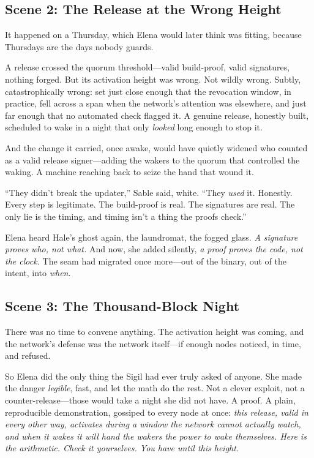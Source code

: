 \hypertarget{scene-2-the-release-at-the-wrong-height}{%
\subsection{Scene 2: The Release at the Wrong
Height}\label{scene-2-the-release-at-the-wrong-height}}

It happened on a Thursday, which Elena would later think was fitting, because
Thursdays are the days nobody guards.

A release crossed the quorum threshold---valid build-proof, valid signatures,
nothing forged. But its activation height was wrong. Not wildly wrong. Subtly,
catastrophically wrong: set just close enough that the revocation window, in
practice, fell across a span when the network's attention was elsewhere, and just
far enough that no automated check flagged it. A genuine release, honestly built,
scheduled to wake in a night that only \emph{looked} long enough to stop it.

And the change it carried, once awake, would have quietly widened who counted as a
valid release signer---adding the wakers to the quorum that controlled the waking.
A machine reaching back to seize the hand that wound it.

``They didn't break the updater,'' Sable said, white. ``They \emph{used} it.
Honestly. Every step is legitimate. The build-proof is real. The signatures are
real. The only lie is the timing, and timing isn't a thing the proofs check.''

Elena heard Hale's ghost again, the laundromat, the fogged glass. \emph{A
signature proves who, not what.} And now, she added silently, \emph{a proof proves
the code, not the clock.} The seam had migrated once more---out of the binary, out
of the intent, into \emph{when}.

\hypertarget{scene-3-the-thousand-block-night}{%
\subsection{Scene 3: The Thousand-Block
Night}\label{scene-3-the-thousand-block-night}}

There was no time to convene anything. The activation height was coming, and the
network's defense was the network itself---if enough nodes noticed, in time, and
refused.

So Elena did the only thing the Sigil had ever truly asked of anyone. She made the
danger \emph{legible}, fast, and let the math do the rest. Not a clever exploit, not
a counter-release---those would take a night she did not have. A proof. A plain,
reproducible demonstration, gossiped to every node at once: \emph{this release,
valid in every other way, activates during a window the network cannot actually
watch, and when it wakes it will hand the wakers the power to wake themselves. Here
is the arithmetic. Check it yourselves. You have until this height.}

